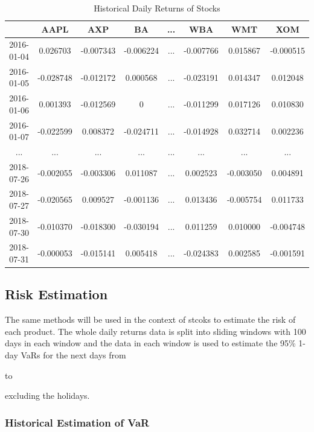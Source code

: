 \documentclass[11pt]{article} %
\theoremstyle{plain}
\theoremstyle{definition}
\begin{document}
{
  \begin{table}[ht]
    \centering
    \scriptsize
    \begin{tabular}{|c|c c c c c c c|}
      \hline
       & AAPL & AXP & BA & ... & WBA & WMT & XOM \\ [0.5ex]
      \hline
      2016-01-04 & 0.026703 & -0.007343 & -0.006224 & ... & -0.007766 & 0.015867 & -0.000515 \\
      \hline
      2016-01-05 & -0.028748 & -0.012172 & 0.000568 & ... & -0.023191 & 0.014347 & 0.012048 \\
      \hline
      2016-01-06 & 0.001393 & -0.012569 & 0 & ... & -0.011299 & 0.017126 & 0.010830 \\
      \hline
      2016-01-07 & -0.022599 & 0.008372 & -0.024711 & ... & -0.014928 & 0.032714 & 0.002236 \\
      \hline
      ... & ... & ... & ... & ... & ... & ... & ... \\
      \hline
      2018-07-26 & -0.002055 & -0.003306 & 0.011087 & ... & 0.002523 & -0.003050 & 0.004891 \\
      \hline
      2018-07-27 & -0.020565 & 0.009527 & -0.001136 & ... & 0.013436 & -0.005754 & 0.011733 \\
      \hline
      2018-07-30 & -0.010370 & -0.018300 & -0.030194 & ... & 0.011259 & 0.010000 & -0.004748 \\
      \hline
      2018-07-31 & -0.000053 & -0.015141 & 0.005418 & ... & -0.024383 & 0.002585 & -0.001591 \\
      \hline
    \end{tabular}
    \caption{Historical Daily Returns of Stocks}
    \label{table:drstock}
  \end{table}
}

\subsection{Risk Estimation}

The same methods will be used in the context of stcoks to estimate the risk of each product. The whole daily returns data is split into sliding windows with 100 days in each window and the data in each window is used to estimate the 95\% 1-day VaRs for the next days from \date{26th May 2016} to \date{31st July 2018} excluding the holidays.

\subsubsection{Historical Estimation of VaR}
\end{document}
